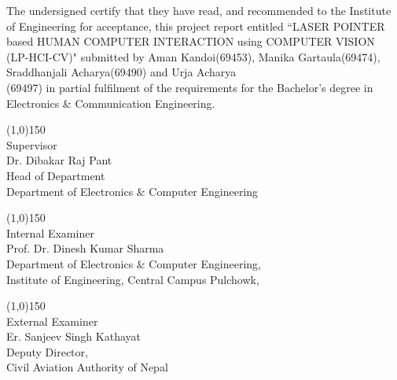 \vspace{0.5cm}
        The undersigned certify that they have read, and recommended to the Institute of Engineering for acceptance, this project report entitled ``LASER POINTER based HUMAN­ COMPUTER INTERACTION using COMPUTER VISION (LP-­HCI-­CV)" submitted by Aman Kandoi(69453), Manika Gartaula(69474), Sraddhanjali Acharya(69490) and Urja Acharya \\(69497) in partial fulfilment of the requirements for the Bachelor's degree in Electronics \& Communication Engineering.
        
\vspace{1cm}
\noindent
\begin{minipage}[t]{0.45\textwidth}
\line(1,0){150}\\
Supervisor\\
Dr. Dibakar Raj Pant\\
Head of Department\\
Department of Electronics \& Computer Engineering\\
\end{minipage}

\vspace{1cm}
\noindent
\begin{minipage}[t]{0.45\textwidth}
\line(1,0){150}\\
Internal Examiner\\
Prof. Dr. Dinesh Kumar Sharma\\
Department of Electronics \& Computer Engineering,\\
Institute of Engineering, Central Campus Pulchowk,\\
\end{minipage}\hfill
\begin{minipage}[t]{0.45\textwidth}
\line(1,0){150}\\
External Examiner\\
Er. Sanjeev Singh Kathayat\\
Deputy Director, \\
Civil Aviation Authority of Nepal
\end{minipage}


